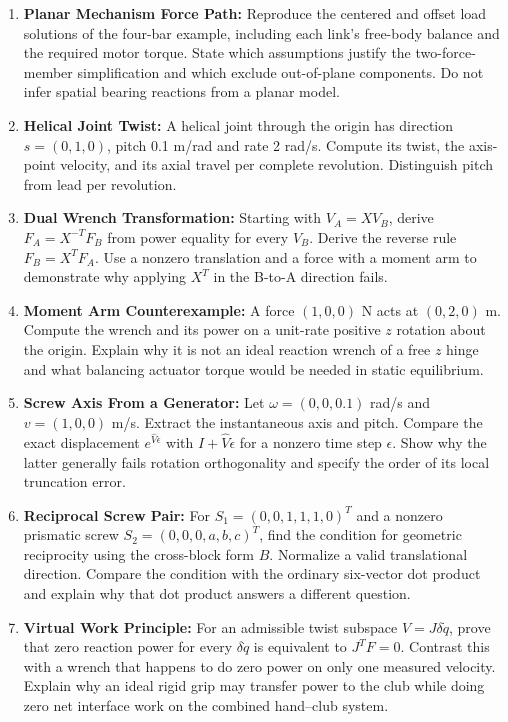 \begin{enumerate}
\item \textbf{Planar Mechanism Force Path:} Reproduce the centered and offset load solutions of the four-bar example, including each link's free-body balance and the required motor torque. State which assumptions justify the two-force-member simplification and which exclude out-of-plane components. Do not infer spatial bearing reactions from a planar model.
\item \textbf{Helical Joint Twist:} A helical joint through the origin has direction $s=(0,1,0)$, pitch 0.1 m/rad and rate 2 rad/s. Compute its twist, the axis-point velocity, and its axial travel per complete revolution. Distinguish pitch from lead per revolution.
\item \textbf{Dual Wrench Transformation:} Starting with $V_A=XV_B$, derive $F_A=X^{-T}F_B$ from power equality for every $V_B$. Derive the reverse rule $F_B=X^TF_A$. Use a nonzero translation and a force with a moment arm to demonstrate why applying $X^T$ in the B-to-A direction fails.
\item \textbf{Moment Arm Counterexample:} A force $(1,0,0)$ N acts at $(0,2,0)$ m. Compute the wrench and its power on a unit-rate positive $z$ rotation about the origin. Explain why it is not an ideal reaction wrench of a free $z$ hinge and what balancing actuator torque would be needed in static equilibrium.
\item \textbf{Screw Axis From a Generator:} Let $\omega=(0,0,0.1)$ rad/s and $v=(1,0,0)$ m/s. Extract the instantaneous axis and pitch. Compare the exact displacement $e^{\widehat V\epsilon}$ with $I+\widehat V\epsilon$ for a nonzero time step $\epsilon$. Show why the latter generally fails rotation orthogonality and specify the order of its local truncation error.
\item \textbf{Reciprocal Screw Pair:} For $S_1=(0,0,1,1,1,0)^T$ and a nonzero prismatic screw $S_2=(0,0,0,a,b,c)^T$, find the condition for geometric reciprocity using the cross-block form $B$. Normalize a valid translational direction. Compare the condition with the ordinary six-vector dot product and explain why that dot product answers a different question.
\item \textbf{Virtual Work Principle:} For an admissible twist subspace $V=J\delta\dot q$, prove that zero reaction power for every $\delta\dot q$ is equivalent to $J^TF=0$. Contrast this with a wrench that happens to do zero power on only one measured velocity. Explain why an ideal rigid grip may transfer power to the club while doing zero net interface work on the combined hand--club system.
\end{enumerate}

